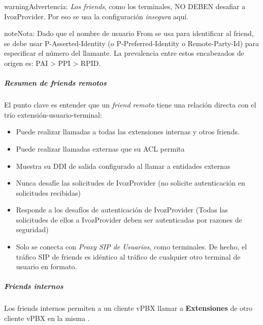 \documentclass[letterpaper,10pt,spanish]{sphinxmanual}
\begin{document}
\begin{notice}{warning}{Advertencia:}
\emph{Los friends}, como los terminales, NO DEBEN desafiar a IvozProvider. Por eso se usa la configuración \emph{insegura} aquí.
\end{notice}

\begin{notice}{note}{Nota:}
Dado que el nombre de usuario From se usa para identificar al friend, se debe usar P-Asserted-Identity (o P-Preferred-Identity o Remote-Party-Id) para especificar el número del llamante. La prevalencia entre estos encabezados de origen es: PAI \textgreater{} PPI \textgreater{} RPID.
\end{notice}


\subparagraph{Resumen de friends remotos}
\label{administration_portal/client/vpbx/routing_endpoints/friends/remote_friends:summary-of-remote-friends}
El punto clave es entender que un \emph{friend remoto} tiene una relación directa con el trío extensión-usuario-terminal:
\begin{itemize}
\item {} 
Puede realizar llamadas a todas las extensiones internas y otros friends.

\item {} 
Puede realizar llamadas externas que su ACL permita

\item {} 
Muestra su DDI de salida configurado al llamar a entidades externas

\item {} 
Nunca desafíe las solicitudes de IvozProvider (no solicite autenticación en solicitudes recibidas)

\item {} 
Responde a los desafíos de autenticación de IvozProvider (Todas las solicitudes de ellos a IvozProvider deben ser autenticadas por razones de seguridad)

\item {} 
Solo se conecta con \emph{Proxy SIP de Usuarios}, como terminales. De hecho, el tráfico SIP de friends es idéntico al tráfico de cualquier otro terminal de usuario en formato.

\end{itemize}


\subparagraph{Friends internos}
\label{administration_portal/client/vpbx/routing_endpoints/friends/internal_friends:id1}\label{administration_portal/client/vpbx/routing_endpoints/friends/internal_friends::doc}\label{administration_portal/client/vpbx/routing_endpoints/friends/internal_friends:internal-friends}
Los friends internos permiten a un cliente vPBX llamar a \textbf{Extensiones} de otro cliente vPBX en la misma {\hyperref[administration_portal/brand/settings/corporations:corporations]{}}.
\end{document}
